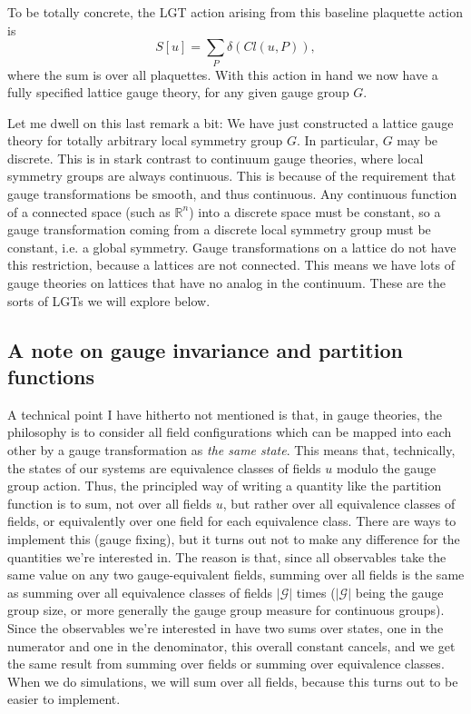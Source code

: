 \documentclass[9pt,twocolumn,twoside]{article}
\begin{document}
To be totally concrete, the LGT action arising from this baseline plaquette action is 
\[S[u] = \sum_P \delta\left(Cl(u,P)\right),\]
where the sum is over all plaquettes.  With this action in hand we now have a fully specified lattice gauge theory, for any given gauge group $G$.  

Let me dwell on this last remark a bit: We have just constructed a lattice gauge theory for totally arbitrary local symmetry group $G$.  In particular, $G$ may be discrete.  This is in stark contrast to continuum gauge theories, where local symmetry groups are always continuous.  This is because of the requirement that gauge transformations be smooth, and thus continuous.  Any continuous function of a connected space (such as $\mathbb{R}^n$) into a discrete space must be constant, so a gauge transformation coming from a discrete local symmetry group must be constant, i.e. a global symmetry.  Gauge transformations on a lattice do not have this restriction, because a lattices are not connected.  This means we have lots of gauge theories on lattices that have no analog in the continuum.  These are the sorts of LGTs we will explore below. 

\subsection{A note on gauge invariance and partition functions}
A technical point I have hitherto not mentioned is that, in gauge theories, the philosophy is to consider all field configurations which can be mapped into each other by a gauge transformation as \textit{the same state}.  This means that, technically, the states of our systems are equivalence classes of fields $u$ modulo the gauge group action.  Thus, the principled way of writing a quantity like the partition function is to sum, not over all fields $u$, but rather over all equivalence classes of fields, or equivalently over one field for each equivalence class.  There are ways to implement this (gauge fixing), but it turns out not to make any difference for the quantities we're interested in.  The reason is that, since all observables take the same value on any two gauge-equivalent fields, summing over all fields is the same as summing over all equivalence classes of fields $|\mathcal{G}|$ times ($|\mathcal{G}|$ being the gauge group size, or more generally the gauge group measure for continuous groups).  Since the observables we're interested in have two sums over states, one in the numerator and one in the denominator, this overall constant cancels, and we get the same result from summing over fields or summing over equivalence classes.  When we do simulations, we will sum over all fields, because this turns out to be easier to implement.
\end{document}
